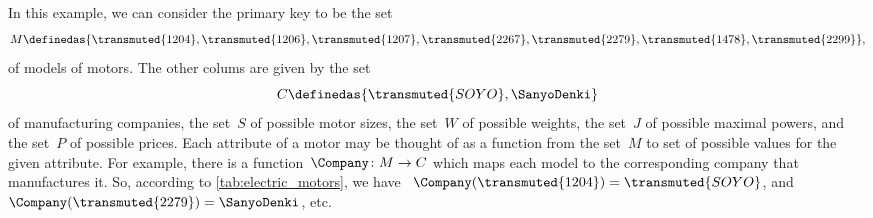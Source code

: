 \begin{comment}
  \begin{table}[h]
    \centering
    \begin{tabular}{c|c|c|c|c|c}
      Motor ID          & Company              & Size      & \unit[Weight]{[g]} & \unit[Max Power]{[W]} & \unit[price]{[USD]} \\
      \hline
      $\textsf{Model1}$ & Company $\textsf{B}$ & 2 x 3 x 4 & 10                 &                       & 259                 \\
      $\textsf{Model2}$ & Company $\textsf{A}$ & 2 x 3 x 4 & 20                 &                       & 109                 \\
      $\textsf{Model3}$ & Company $\textsf{B}$ & 2 x 3 x 4 & 5                  &                       & 124                 \\
      $\textsf{Model4}$ & Company $\textsf{C}$ & 2 x 3 x 4 & 30                 &                       & 399                 \\
      $\textsf{Model5}$ & Company $\textsf{A}$ & 2 x 3 x 4 & 45                 &                       & 245                 \\
      $\textsf{Model6}$ & Company $\textsf{D}$ & 2 x 3 x 4 & 20                 &                       & 89                  \\
      $\textsf{Model7}$ & Company $\textsf{B}$ & 2 x 3 x 4 & 15                 &                       & 130
    \end{tabular}
    \caption{A simplified catalogue of motors.}
    \label{tab:electric_motors}
  \end{table}
\end{comment}

In this example, we can consider the primary key to be the set
\begin{equation*}
  M \definedas \{ \transmuted{1204}, \transmuted{1206}, \transmuted{1207}, \transmuted{2267}, \transmuted{2279}, \transmuted{1478}, \transmuted{2299} \},
\end{equation*}
of models of motors. The other colums are given by the set
\begin{equation*}
  C \definedas \{ \transmuted{SOYO},\SanyoDenki\}
\end{equation*}
of manufacturing companies, the set~$S$ of possible motor sizes, the set~$W$ of possible weights, the set~$J$ of possible maximal powers, and the set~$P$ of possible prices. Each attribute of a motor may be thought of as a function from the set~$M$ to set of possible values for the given attribute. For example, there is a function~$\Company\colon M \to C$ which maps each model to the corresponding company that manufactures it. So, according to \cref{tab:electric_motors}, we have \text{\eg }~$\Company(\transmuted{1204}) = \transmuted{SOYO}$, and~$\Company(\transmuted{2279}) =\SanyoDenki$, etc.

